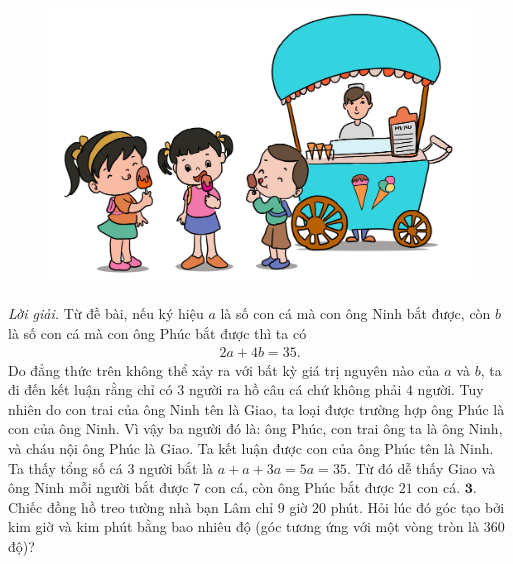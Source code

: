 \begin{multicols}{2}
\begin{figure}[H]
		\includegraphics[width=1\linewidth]{bai2}
		\vspace*{-15pt}
		\end{figure}
	\textit{Lời giải.} 	Từ đề bài, nếu ký hiệu $a$ là số con cá mà con ông Ninh bắt được, còn $b$ là số con cá mà con ông Phúc bắt được thì ta có 
	\begin{align*}
			2a+4b = 35.
		\end{align*}
	Do đẳng thức trên không thể xảy ra với bất kỳ giá trị nguyên nào của $a$ và $b$, ta đi đến kết luận rằng chỉ có $3$ người ra hồ câu cá chứ không phải $4$ người. Tuy nhiên do con trai của ông Ninh tên là Giao, ta loại được trường hợp ông Phúc là con của ông Ninh. Vì vậy ba người đó là: ông Phúc, con trai ông ta là ông Ninh,  và cháu nội ông Phúc là Giao. Ta kết luận được con của ông Phúc tên là Ninh.
	\vskip 0.1cm
	Ta thấy tổng số cá $3$ người bắt là $a+a+3a=5a = 35$. Từ đó dễ thấy Giao và ông Ninh mỗi người bắt được $7$ con cá, còn ông Phúc bắt được $21$ con cá.
	\vskip 0.1cm
	$\pmb{3.}$ Chiếc đồng hồ treo tường nhà bạn Lâm chỉ  $9$ giờ $20$ phút. Hỏi lúc đó góc tạo bởi kim giờ và kim phút bằng bao nhiêu độ (góc tương ứng với một vòng tròn là $360$ độ)?
	

\end{multicols}
